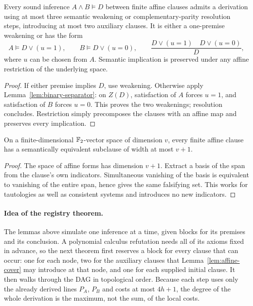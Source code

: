 \begin{lemma}\label{lem:affine-cover}
Every sound inference \(A\wedge B\models D\)
between finite affine clauses admits a derivation using at most three
semantic weakening or complementary-parity resolution steps, introducing
at most two auxiliary clauses. It is either a one-premise weakening or
has the form
\[
 A\models D\vee(u=1),\qquad B\models D\vee(u=0),
 \qquad\frac{D\vee(u=1)\quad D\vee(u=0)}D,
\]
where \(u\) can be chosen from \(A\). Semantic implication is preserved
under any affine restriction of the underlying space.
\end{lemma}
\begin{proof}
If either premise implies \(D\), use weakening. Otherwise apply
Lemma~\ref{lem:binary-separator}: on \(Z(D)\), satisfaction of \(A\)
forces \(u=1\), and satisfaction of \(B\) forces \(u=0\).
This proves the two weakenings; resolution concludes. Restriction simply
precomposes the clauses with an affine map and preserves every implication.
\end{proof}

\begin{lemma}\label{lem:compression}
On a finite-dimensional \(\mathbb F_2\)-vector space of dimension \(v\), every
finite affine clause has a semantically equivalent subclause of width at
most \(v+1\).
\end{lemma}
\begin{proof}
The space of affine forms has dimension \(v+1\). Extract a basis of the
span from the clause's own indicators. Simultaneous vanishing of the basis
is equivalent to vanishing of the entire span, hence gives the same
falsifying set. This works for tautologies as well as consistent systems
and introduces no new indicators.
\end{proof}

\paragraph{Idea of the registry theorem.}
The lemmas above simulate one inference at a time, given blocks for its
premises and its conclusion. A polynomial calculus refutation needs all of
its axioms fixed in advance, so the next theorem first reserves a block for
every clause that can occur: one for each node, two for the auxiliary
clauses that Lemma~\ref{lem:affine-cover} may introduce at that node, and
one for each supplied initial clause. It then walks through the DAG in
topological order. Because each step uses only the already derived lines
\(P_A\), \(P_B\) and costs at most \(4h+1\), the degree of the whole
derivation is the maximum, not the sum, of the local costs.


